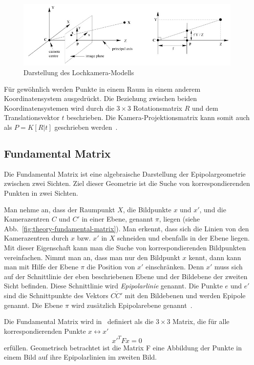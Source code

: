 \begin{figure}
    \centering
    \includegraphics[width=\textwidth]{src/img/hartley_2003_lochkamera.jpg}
    \caption{Darstellung des Lochkamera-Modells~\cite[Fig. 6.1]{hartley_2003}}
    \label{fig:theory-pinhole-camera}
\end{figure}


Für gewöhnlich werden Punkte in einem Raum in einem anderem Koordinatensystem ausgedrückt.
Die Beziehung zwischen beiden Koordinatensystemen wird durch die $3\times 3$ Rotationsmatrix $R$ und dem Translationsvektor $t$ beschrieben. 
Die Kamera-Projektionsmatrix kann somit auch als $P=K[R|t]$ geschrieben werden~\cite[Kapitel 6.1,S. 156, Gleichung 6.7]{hartley_2003}.


\subsection{Fundamental Matrix}
Die Fundamental Matrix ist eine algebraische Darstellung der Epipolargeometrie zwischen zwei Sichten.
Ziel dieser Geometrie ist die Suche von korrespondierenden Punkten in zwei Sichten.

Man nehme an, dass der Raumpunkt $X$, die Bildpunkte $x$ und $x'$, und die Kamerazentren $C$ und $C'$ in einer Ebene, genannt $\pi$, liegen (siehe Abb.~\ref{fig:theory-fundamental-matrix}).
Man erkennt, dass sich die Linien von den Kamerazentren durch $x$ bzw. $x'$ in $X$ schneiden und ebenfalls in der Ebene liegen.
Mit dieser Eigenschaft kann man die Suche von korrespondierenden Bildpunkten vereinfachen.
Nimmt man an, dass man nur den Bildpunkt $x$ kennt, dann kann man mit Hilfe der Ebene $\pi$ die Position von $x'$ einschränken.
Denn $x'$ muss sich auf der Schnittlinie der eben beschriebenen Ebene und der Bildebene der zweiten Sicht befinden. 
Diese Schnittlinie wird \emph{Epipolarlinie} genannt.
Die Punkte $e$ und $e'$ sind die Schnittpunkte des Vektors $\overline{CC'}$ mit den Bildebenen und werden Epipole genannt.
Die Ebene $\pi$ wird zusätzlich Epipolarebene genannt~\cite[Kapitel 9,1]{hartley_2003}.

Die Fundamental Matrix wird in~\cite[Kapitel 9.2]{hartley_2003} definiert als die $3\times 3$ Matrix, die für alle korrespondierenden Punkte $x \leftrightarrow x'$ 
\[ x'^TFx=0\] 
erfüllen.
Geometrisch betrachtet ist die Matrix F eine Abbildung der Punkte in einem Bild auf ihre Epipolarlinien im zweiten Bild.

